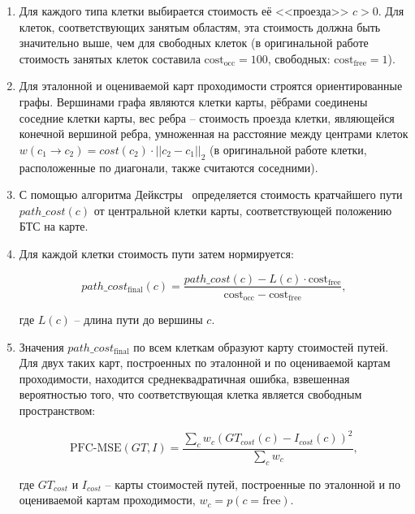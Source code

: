 \begin{enumerate}
	\item Для каждого типа клетки выбирается стоимость её <<проезда>> $c>0$. Для клеток, соответствующих занятым областям, эта стоимость должна быть значительно выше, чем для свободных клеток (в оригинальной работе стоимость занятых клеток составила $\text{cost}_\text{occ} = 100$, свободных: $\text{cost}_\text{free} = 1$).
	\item Для эталонной и оцениваемой карт проходимости строятся ориентированные графы. Вершинами графа являются клетки карты, рёбрами соединены соседние клетки карты, вес ребра -- стоимость проезда клетки, являющейся конечной вершиной ребра, умноженная на расстояние между центрами клеток $w(c_1\rightarrow c_2) = cost(c_2) \cdot ||c_2 - c_1||_2$ (в оригинальной работе клетки, расположенные по диагонали, также считаются соседними).
	\item С помощью алгоритма Дейкстры~\cite{dijkstra1959note} определяется стоимость кратчайшего пути $path\_cost(c)$ от центральной клетки карты, соответствующей положению БТС на карте.
	\item Для каждой клетки стоимость пути затем нормируется: 
	
	\begin{equation}
		path\_cost_\text{final}(c) = \dfrac{path\_cost(c) - L(c) \cdot \text{cost}_\text{free}}{\text{cost}_\text{occ} - \text{cost}_\text{free}},
		\label{eq:path_cost_norm}
	\end{equation}
	
	где $L(c)$ -- длина пути до вершины $c$. 
	\item Значения $path\_cost_\text{final}$ по всем клеткам образуют карту стоимостей путей. Для двух таких карт, построенных по эталонной и по оцениваемой картам проходимости, находится среднеквадратичная ошибка, взвешенная вероятностью того, что соответствующая клетка является свободным пространством:
	
	\begin{equation}
		\text{PFC-MSE}(GT, I) = \dfrac{\sum_c w_c\left(GT_{cost}(c) - I_{cost}(c)\right)^2}{\sum_c w_c},
		\label{eq:pfc_mse}
	\end{equation}
	
	где $GT_{cost}$ и $I_{cost}$ -- карты стоимостей путей, построенные по эталонной и по оцениваемой картам проходимости, $w_c = p(c = \text{free})$.
\end{enumerate}

